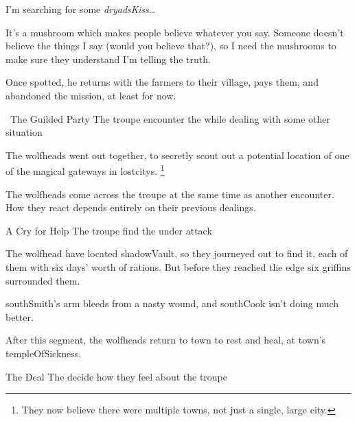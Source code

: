 \begin{speechtext}
  I'm searching for some \textit{\gls{dryadsKiss}}\ldots

  It's a mushroom which makes people believe whatever you say.
  Someone doesn't believe the things I say (would you believe that?), so I need the mushrooms to make sure they understand I'm telling the truth.
\end{speechtext}

Once spotted, he returns with the farmers to their \gls{village}, pays them, and abandoned the mission, at least for now.

{\squash~The Guilded Party}%
{The troupe encounter the  while dealing with some other situation}%

\begin{exampletext}
  The \glspl{wolfhead} went out together, to secretly scout out a potential location of one of the magical gateways in \glspl{lostcity}.%
  \footnote{They now believe there were multiple towns, not just a single, large city.}
\end{exampletext}

The \glspl{wolfhead} come across the troupe at the same time as another encounter.
How they react depends entirely on their previous dealings.

{A Cry for Help}%
{The troupe find the  under attack}%

The \gls{wolfhead} have located \gls{shadowVault}, so they journeyed out to find it, each of them with six days' worth of rations.
But before they reached the \gls{edge} six griffins surrounded them.


\Gls{southSmith}'s arm bleeds from a nasty wound, and \gls{southCook} isn't doing much better.

\setcounter{wounds}{3}
\southCook


After this \gls{segment}, the \glspl{wolfhead} return to \gls{town} to rest and heal, at \gls{town}'s \gls{templeOfSickness}.


{The Deal}%
{The  decide how they feel about the troupe}%

